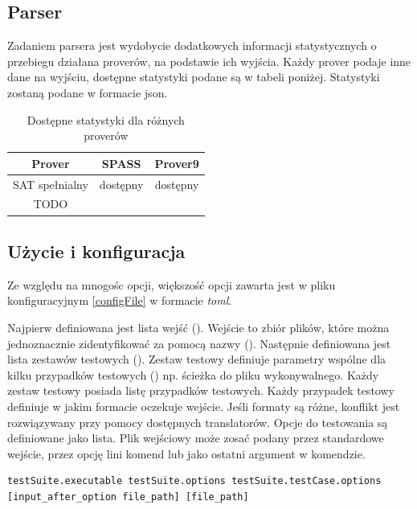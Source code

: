 \documentclass[a4paper,12pt]{article}
\begin{document}
\subsection{Parser} \label{parser}

Zadaniem parsera jest wydobycie dodatkowych informacji statystycznych o przebiegu działana proverów, na podstawie ich wyjścia.
\newline
Każdy prover podaje inne dane na wyjściu, dostępne statystyki podane są w tabeli poniżej.
\newline
Statystyki zostaną podane w formacie json.

\begin{table}[ht]
  \centering
  \caption{Dostępne statystyki dla różnych proverów}
  \begin{tabular}{ |c|c|c| }
    \hline
    Prover & SPASS & Prover9 \\
    \hline
    SAT spełnialny & dostępny & dostępny \\
    \hline
    TODO & & \\
    \hline
  \end{tabular}
\end{table}

\subsection{Użycie i konfiguracja} \label{benchmarkUsage}

Ze względu na mnogośc opcji, większość opcji zawarta jest w pliku konfiguracyjnym \ref{configFile} w formacie \textit{toml}.

Najpierw definiowana jest lista wejść (). Wejście to zbiór plików, które można jednoznacznie zidentyfikować za pomocą nazwy ().
Następnie definiowana jest lista zestawów testowych (). Zestaw testowy definiuje parametry wspólne dla kilku przypadków testowych () np. ścieżka do pliku wykonywalnego. Każdy zestaw testowy posiada listę przypadków testowych. Każdy przypadek testowy definiuje w jakim formacie oczekuje wejście. Jeśli formaty są różne, konflikt jest rozwiązywany przy pomocy dostępnych translatorów. Opcje do testowania są definiowane jako lista. Plik wejściowy może zosać podany przez standardowe wejście, przez opcję lini komend lub jako ostatni argument w komendzie.

\begin{verbatim}
testSuite.executable testSuite.options testSuite.testCase.options [input_after_option file_path] [file_path]
\end{verbatim}
\end{document}
